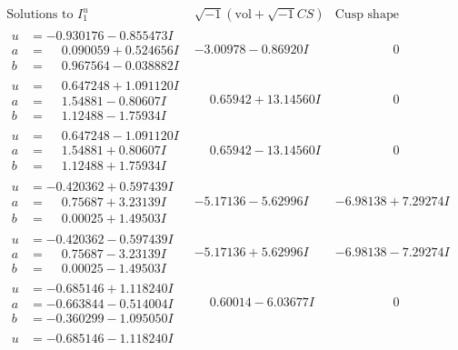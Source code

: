 \documentclass[1p]{elsarticle_modified}
\theoremstyle{definition}
\newcommand{\I}{\sqrt{-1}}
\begin{document}
$$\begin{array}{c|c|c}
\text{Solutions to }I^u_{1}& \I (\text{vol} + \sqrt{-1}CS) & \text{Cusp shape}\\
 \hline 
\begin{aligned}
u &= -0.930176 - 0.855473 I \\
a &= \phantom{-}0.090059 + 0.524656 I \\
b &= \phantom{-}0.967564 - 0.038882 I\end{aligned}
 & -3.00978 - 0.86920 I & \phantom{-0.000000 } 0 \\ \hline\begin{aligned}
u &= \phantom{-}0.647248 + 1.091120 I \\
a &= \phantom{-}1.54881 - 0.80607 I \\
b &= \phantom{-}1.12488 - 1.75934 I\end{aligned}
 & \phantom{-}0.65942 + 13.14560 I & \phantom{-0.000000 } 0 \\ \hline\begin{aligned}
u &= \phantom{-}0.647248 - 1.091120 I \\
a &= \phantom{-}1.54881 + 0.80607 I \\
b &= \phantom{-}1.12488 + 1.75934 I\end{aligned}
 & \phantom{-}0.65942 - 13.14560 I & \phantom{-0.000000 } 0 \\ \hline\begin{aligned}
u &= -0.420362 + 0.597439 I \\
a &= \phantom{-}0.75687 + 3.23139 I \\
b &= \phantom{-}0.00025 + 1.49503 I\end{aligned}
 & -5.17136 - 5.62996 I & -6.98138 + 7.29274 I \\ \hline\begin{aligned}
u &= -0.420362 - 0.597439 I \\
a &= \phantom{-}0.75687 - 3.23139 I \\
b &= \phantom{-}0.00025 - 1.49503 I\end{aligned}
 & -5.17136 + 5.62996 I & -6.98138 - 7.29274 I \\ \hline\begin{aligned}
u &= -0.685146 + 1.118240 I \\
a &= -0.663844 - 0.514004 I \\
b &= -0.360299 - 1.095050 I\end{aligned}
 & \phantom{-}0.60014 - 6.03677 I & \phantom{-0.000000 } 0 \\ \hline\begin{aligned}
u &= -0.685146 - 1.118240 I \\

\end{aligned}
\end{array}$$
\end{document}

